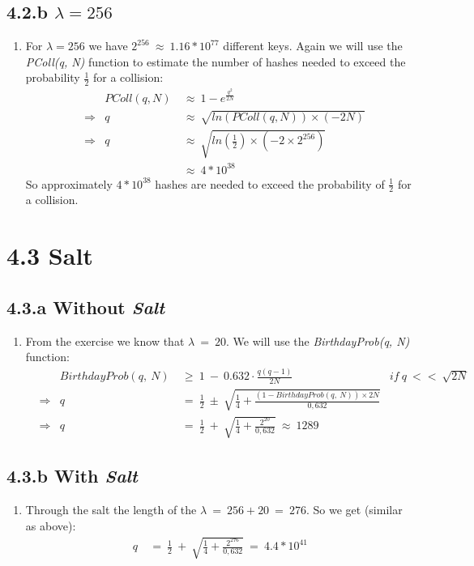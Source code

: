 \documentclass{report}
\begin{document}
	\subsection*{4.2.b $\lambda = 256$}
	\begin{enumerate}[]
		\item For $\lambda = 256$ we have $2^{256} \ \approx \ 1.16 * 10^{77}$ different keys.  Again we will use the \textit{PColl(q, N)} function to estimate the number of hashes needed to exceed the probability $\frac{1}{2}$ for a collision:
		\begin{align*}
			& &PColl(q, N) \ & \approx \ 1 - e^{\frac{q^2}{2N}} \\
			& \Rightarrow & q \ & \approx \ \sqrt{ln(PColl(q, N)) \times (-2N)} \\
			& \Rightarrow & q \ & \approx \ \sqrt{ln(\frac{1}{2}) \times (-2 \times 2^{256})} \\
			& & & \approx \ 4 * 10^{38}
		\end{align*}
		So approximately $4 * 10^{38}$ hashes are needed to exceed the probability of $\frac{1}{2}$ for a collision.
	\end{enumerate}
	
	\section*{4.3 Salt}
	\subsection*{4.3.a Without \textit{Salt}}
	\begin{enumerate}[]
		\item From the exercise we know that $\lambda \ = \ 20$. We will use the \textit{BirthdayProb(q, N)} function:
		\begin{align*}
			& &BirthdayProb(q,\ N) \ & \geq \ 1 \ - \ 0.632 \cdot \frac{q(q-1)}{2N} & if \ q \ << \ \sqrt{2N} \\
			& \Rightarrow & q \ & = \ \frac{1}{2} \ \pm \ \sqrt{\frac{1}{4} + \frac{(1-BirthdayProb(q, \ N)) \times 2N}{0,632}} \\
			& \Rightarrow & q \ & = \ \frac{1}{2} \ + \ \sqrt{\frac{1}{4} + \frac{2^{20}}{0,632}} \ \approx \ 1289
		\end{align*}
	\end{enumerate}
	\subsection*{4.3.b With \textit{Salt}}
	\begin{enumerate}[]
		\item Through the salt the length of the $\lambda \ = \ 256 + 20 \ = \ 276$. So we get (similar as above):
		\begin{align*}
			q \ & = \ \frac{1}{2} \ + \ \sqrt{\frac{1}{4} + \frac{2^{276}}{0,632}} \ = \ 4.4 * 10^{41}
		\end{align*}
	\end{enumerate}
	
\end{document}

